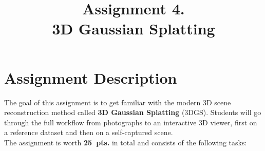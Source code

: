 \documentclass{article}
\title{Assignment 4. \\ 3D Gaussian Splatting}
\date{}
\begin{document}
\maketitle

\section*{Assignment Description}

The goal of this assignment is to get familiar with the modern 3D scene reconstruction
method called \textbf{3D Gaussian Splatting} (3DGS).
Students will go through the full workflow from photographs to an interactive 3D viewer,
first on a reference dataset and then on a self-captured scene.
\\[4pt]
The assignment is worth \textbf{25~pts.} in total and consists of the following tasks:
\end{document}
